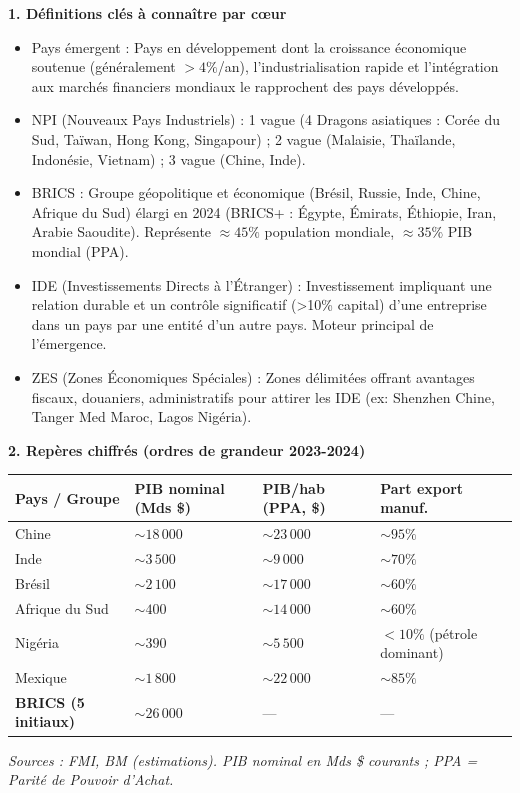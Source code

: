 \documentclass[11pt]{article}
\newcommand{\cle}[1]{{\popxbold\color{popdark}#1}}
\begin{document}
\begin{bilan}

\textbf{1. Définitions clés à connaître par cœur}
\begin{itemize}
    \item \cle{Pays émergent} : Pays en développement dont la croissance économique soutenue (généralement $> 4\%$/an), l'industrialisation rapide et l'intégration aux marchés financiers mondiaux le rapprochent des pays développés.
    \item \cle{NPI (Nouveaux Pays Industriels)} : 1 vague (4 Dragons asiatiques : Corée du Sud, Taïwan, Hong Kong, Singapour) ; 2 vague (Malaisie, Thaïlande, Indonésie, Vietnam) ; 3 vague (Chine, Inde).
    \item \cle{BRICS} : Groupe géopolitique et économique (Brésil, Russie, Inde, Chine, Afrique du Sud) élargi en 2024 (BRICS+ : Égypte, Émirats, Éthiopie, Iran, Arabie Saoudite). Représente $\approx 45\%$ population mondiale, $\approx 35\%$ PIB mondial (PPA).
    \item \cle{IDE (Investissements Directs à l'Étranger)} : Investissement impliquant une relation durable et un contrôle significatif (\textgreater 10\% capital) d'une entreprise dans un pays par une entité d'un autre pays. Moteur principal de l'émergence.
    \item \cle{ZES (Zones Économiques Spéciales)} : Zones délimitées offrant avantages fiscaux, douaniers, administratifs pour attirer les IDE (ex: Shenzhen Chine, Tanger Med Maroc, Lagos Nigéria).
\end{itemize}

\textbf{2. Repères chiffrés (ordres de grandeur 2023-2024)}
\begin{center}
\begin{tabularx}{\linewidth}{|l|X|X|X|}\hline
\rowcolor{popblueL}
\textbf{Pays / Groupe} & \textbf{PIB nominal (Mds \$)} & \textbf{PIB/hab (PPA, \$)} & \textbf{Part export manuf.} \\ \hline
Chine & $\sim 18\,000$ & $\sim 23\,000$ & $\sim 95\%$ \\ \hline
Inde & $\sim 3\,500$ & $\sim 9\,000$ & $\sim 70\%$ \\ \hline
Brésil & $\sim 2\,100$ & $\sim 17\,000$ & $\sim 60\%$ \\ \hline
Afrique du Sud & $\sim 400$ & $\sim 14\,000$ & $\sim 60\%$ \\ \hline
Nigéria & $\sim 390$ & $\sim 5\,500$ & $< 10\%$ (pétrole dominant) \\ \hline
Mexique & $\sim 1\,800$ & $\sim 22\,000$ & $\sim 85\%$ \\ \hline
\textbf{BRICS (5 initiaux)} & $\sim 26\,000$ & --- & --- \\ \hline
\end{tabularx}
\end{center}
\textit{Sources : FMI, BM (estimations). PIB nominal en Mds \$ courants ; PPA = Parité de Pouvoir d'Achat.}


\end{bilan}
\end{document}
